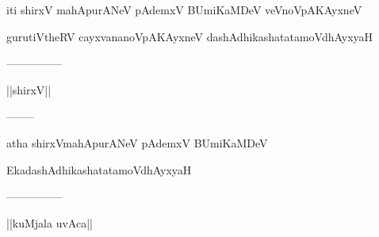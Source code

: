 \documentclass{article}
\begin{document}
\begin{center}
iti shirxV mahApurANeV pAdemxV BUmiKaMDeV veVnoVpAKAyxneV
\end{center}

\begin{center}
gurutiVtheRV cayxvananoVpAKAyxneV dashAdhikashatatamoVdhAyxyaH
\end{center}

\begin{center}
---------------
\end{center}

\begin{center}
||shirxV||
\end{center}

\begin{center}
--------
\end{center}

\begin{center}
atha shirxVmahApurANeV pAdemxV BUmiKaMDeV
\end{center}

\begin{center}
EkadashAdhikashatatamoVdhAyxyaH
\end{center}

\begin{center}
---------------
\end{center}

\begin{center}
||kuMjala uvAca||
\end{center}
\end{document}
